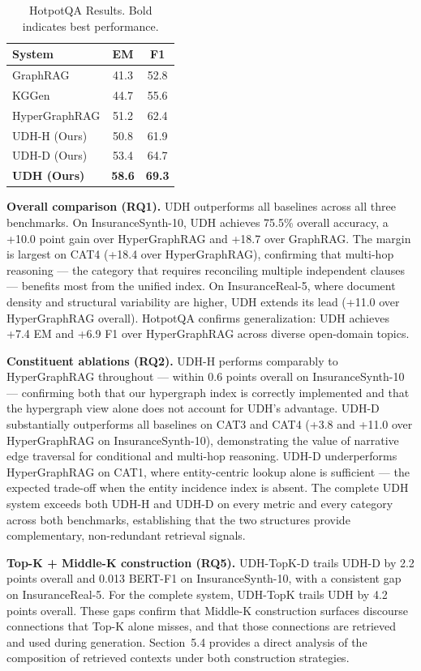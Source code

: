 \documentclass[runningheads]{llncs}
\begin{document}
\begin{table}[h]
\centering
\caption{HotpotQA Results. Bold indicates best performance.}
\label{tab:hotpotqa}
\begin{tabular}{lcc}
\hline
\textbf{System} & \textbf{EM} & \textbf{F1} \\
\hline
GraphRAG         & 41.3 & 52.8 \\
KGGen            & 44.7 & 55.6 \\
HyperGraphRAG    & 51.2 & 62.4 \\
UDH-H (Ours)     & 50.8 & 61.9 \\
UDH-D (Ours)     & 53.4 & 64.7 \\
\textbf{UDH (Ours)} & \textbf{58.6} & \textbf{69.3} \\
\hline
\end{tabular}
\end{table}

\textbf{Overall comparison (RQ1).} UDH outperforms all baselines across all three benchmarks. On InsuranceSynth-10, UDH achieves 75.5\% overall accuracy, a +10.0 point gain over HyperGraphRAG and +18.7 over GraphRAG. The margin is largest on CAT4 (+18.4 over HyperGraphRAG), confirming that multi-hop reasoning --- the category that requires reconciling multiple independent clauses --- benefits most from the unified index. On InsuranceReal-5, where document density and structural variability are higher, UDH extends its lead (+11.0 over HyperGraphRAG overall). HotpotQA confirms generalization: UDH achieves +7.4 EM and +6.9 F1 over HyperGraphRAG across diverse open-domain topics.

\textbf{Constituent ablations (RQ2).} UDH-H performs comparably to HyperGraphRAG throughout --- within 0.6 points overall on InsuranceSynth-10 --- confirming both that our hypergraph index is correctly implemented and that the hypergraph view alone does not account for UDH's advantage. UDH-D substantially outperforms all baselines on CAT3 and CAT4 (+3.8 and +11.0 over HyperGraphRAG on InsuranceSynth-10), demonstrating the value of narrative edge traversal for conditional and multi-hop reasoning. UDH-D underperforms HyperGraphRAG on CAT1, where entity-centric lookup alone is sufficient --- the expected trade-off when the entity incidence index is absent. The complete UDH system exceeds both UDH-H and UDH-D on every metric and every category across both benchmarks, establishing that the two structures provide complementary, non-redundant retrieval signals.

\textbf{Top-K + Middle-K construction (RQ5).} UDH-TopK-D trails UDH-D by 2.2 points overall and 0.013 BERT-F1 on InsuranceSynth-10, with a consistent gap on InsuranceReal-5. For the complete system, UDH-TopK trails UDH by 4.2 points overall. These gaps confirm that Middle-K construction surfaces discourse connections that Top-K alone misses, and that those connections are retrieved and used during generation. Section~5.4 provides a direct analysis of the composition of retrieved contexts under both construction strategies.
\end{document}
